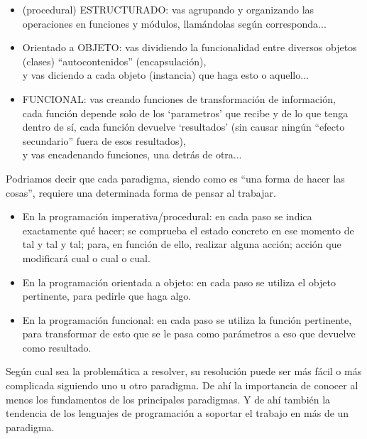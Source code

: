 \documentclass[spanish,12pt,a4paper,final,oneside]{book}
\begin{document}
\begin{itemize}

\item (procedural) ESTRUCTURADO: vas agrupando y organizando las operaciones en funciones y módulos, llamándolas según corresponda...

\item Orientado a OBJETO: vas dividiendo la funcionalidad entre diversos objetos (clases) ``autocontenidos'' (encapsulación), 
\\ y vas diciendo a cada objeto (instancia) que haga esto o aquello...
                        
\item FUNCIONAL: vas creando funciones de transformación de información, \\cada función depende solo de los `parametros' que recibe y de lo que tenga dentro de sí, cada función devuelve `resultados' (sin causar ningún ``efecto secundario'' fuera de esos resultados), 
\\y vas encadenando funciones, una detrás de otra...

\end{itemize}


Podriamos decir que cada paradigma, siendo como es ``una forma de hacer las cosas'', requiere una determinada forma de pensar al trabajar. 

\begin{itemize}

\item En la programación imperativa/procedural: en cada paso se indica exactamente qué hacer; se comprueba el estado concreto en ese momento de tal y tal y tal; para, en función de ello, realizar alguna acción; acción que modificará cual o cual o cual.

\item En la programación orientada a objeto: en cada paso se utiliza el objeto pertinente, para pedirle que haga algo.

\item En la programación funcional: en cada paso se utiliza la función pertinente, para transformar de esto que se le pasa como parámetros a eso que devuelve como resultado.

\end{itemize}

Según cual sea la problemática a resolver, su resolución puede ser más fácil o más complicada siguiendo uno u otro paradigma. De ahí la importancia de conocer al menos los fundamentos de los principales paradigmas. Y de ahí también la tendencia de los lenguajes de programación a soportar el trabajo en más de un paradigma.
\end{document}
